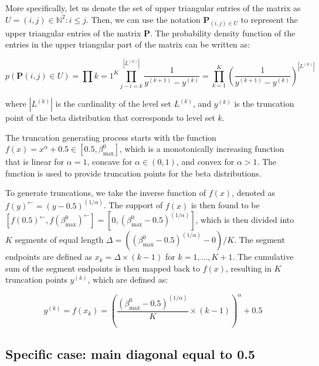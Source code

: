 \documentclass[11pt]{amsart}
\begin{document}
More specifically, let us denote the set of upper triangular entries of the matrix as $U = {(i,j) \in \mathbb{N}^2 : i \leq j}$. Then, we can use the notation $\mathbf{P}_{(i,j) \in U}$ to represent the upper triangular entries of the matrix $\mathbf{P}$. The probability density function of the entries in the upper triangular part of the matrix can be written as:

\begin{equation}
p(\mathbf{P}{(i,j) \in U}) = \prod{k=1}^K \prod_{j-i=k}^{|L^{(k)}|} \frac{1}{y^{(k+1)} - y^{(k)}} = \prod_{k=1}^K \left( \frac{1}{y^{(k+1)} - y^{(k)}} \right)^{|L^{(k)}|}
\end{equation}

where $|L^{(k)}|$ is the cardinality of the level set $L^{(k)}$, and $y^{(k)}$ is the truncation point of the beta distribution that corresponds to level set $k$.

The truncation generating process starts with the function $f(x) = x^\alpha + 0.5 \in [0.5, \beta^0_{\max}]$, which is a monotonically increasing function that is linear for $\alpha = 1$, concave for $\alpha \in (0,1)$, and convex for $\alpha > 1$. The function is used to provide truncation points for the beta distributions.

To generate truncations, we take the inverse function of $f(x)$, denoted as $f(y)^{\leftarrow} = (y - 0.5)^{(1/\alpha)}$. The support of $f(x)$ is then found to be $[f(0.5)^{\leftarrow}, f(\beta^0_{\max})^{\leftarrow}] = [0, (\beta^0_{\max} - 0.5)^{(1/\alpha)}]$, which is then divided into $K$ segments of equal length $\Delta = ((\beta^0_{\max} - 0.5)^{(1/\alpha)} - 0) / K$. The segment endpoints are defined as $x_k = \Delta \times (k-1)$ for $k=1,\ldots,K+1$. The cumulative sum of the segment endpoints is then mapped back to $f(x)$, resulting in $K$ truncation points $y^{(k)}$, which are defined as:

\begin{equation}
y^{(k)} = f(x_k) = \left( \frac{(\beta^0_{\max} - 0.5)^{(1/\alpha)}}{K} \times (k-1) \right)^\alpha + 0.5
\end{equation}


\subsection{Specific case: main diagonal equal to 0.5}
\end{document}

